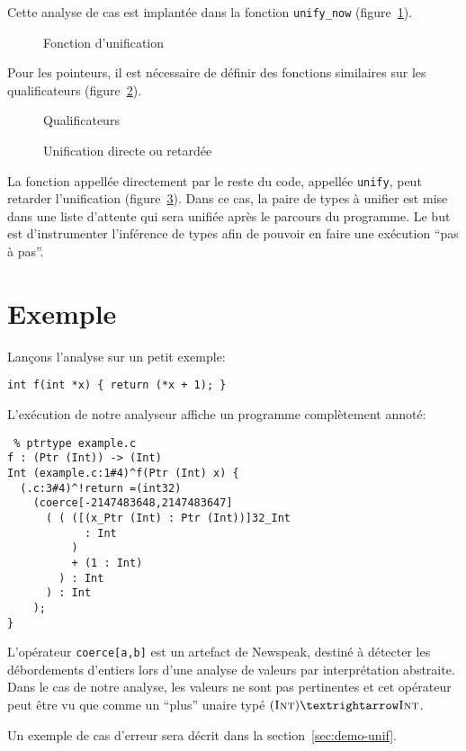 Cette analyse de cas est implantée dans la fonction \texttt{unify_now}
(figure~\ref{fig:implem-unify-now}).

\begin{figure}
\caption{Fonction d'unification}
\label{fig:implem-unify-now}
\end{figure}

Pour les pointeurs, il est nécessaire de définir des fonctions similaires sur
les qualificateurs (figure~\ref{fig:implem-qualifs}).

\begin{figure}


  \caption{Qualificateurs}
\label{fig:implem-qualifs}

\end{figure}

\begin{figure}


\caption{Unification directe ou retardée}
\label{fig:implem-lazy}
\end{figure}

La fonction appellée directement par le reste du code, appellée \texttt{unify},
peut retarder l'unification (figure~\ref{fig:implem-lazy}). Dans ce cas, la
paire de types à unifier est mise dans une liste d'attente qui sera unifiée
après le parcours du programme. Le but est d'instrumenter l'inférence de types
afin de pouvoir en faire une exécution ``pas à pas''.

\section{Exemple}

Lançons l'analyse sur un petit exemple:

\begin{verbatim}
int f(int *x) { return (*x + 1); }
\end{verbatim}

L'exécution de notre analyseur affiche un programme complètement annoté:

\begin{verbatim}
 % ptrtype example.c
f : (Ptr (Int)) -> (Int)
Int (example.c:1#4)^f(Ptr (Int) x) {
  (.c:3#4)^!return =(int32)
    (coerce[-2147483648,2147483647]
      ( ( ([(x_Ptr (Int) : Ptr (Int))]32_Int
            : Int
          )
          + (1 : Int)
        ) : Int
      ) : Int
    );
}
\end{verbatim}

L'opérateur \texttt{coerce[a,b]} est un artefact de Newspeak, destiné à détecter
les débordements d'entiers lors d'une analyse de valeurs par interprétation
abstraite. Dans le cas de notre analyse, les valeurs ne sont pas pertinentes et
cet opérateur peut être vu que comme un ``plus'' unaire typé $(\tInt) → \tInt$.

Un exemple de cas d'erreur sera décrit dans la section~\ref{sec:demo-unif}.



